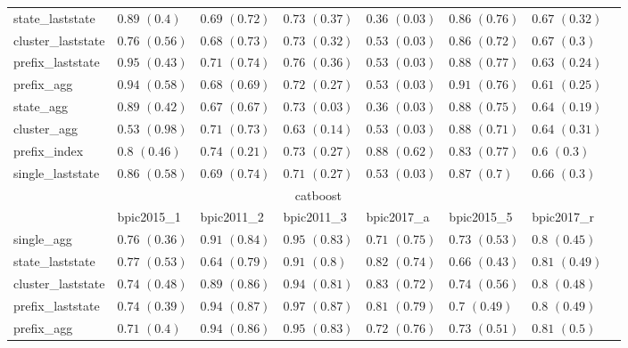 \begin{table}[!htbp]
{\begin{tabular}{llllllll}
			state\_laststate & $0.89$ ${(0.4)}$ & $0.69$ ${(0.72)}$ & $0.73$ ${(0.37)}$ & $0.36$ ${(0.03)}$ & $0.86$ ${(0.76)}$ & $\mathbf{0.67}$ $\mathbf{(0.32)}$  \\
			cluster\_laststate & $0.76$ ${(0.56)}$ & $0.68$ ${(0.73)}$ & $0.73$ ${(0.32)}$ & $0.53$ ${(0.03)}$ & $0.86$ ${(0.72)}$ & $\mathbf{0.67}$ $\mathbf{(0.3)}$  \\
			prefix\_laststate & $0.95$ ${(0.43)}$ & $0.71$ ${(0.74)}$ & $\mathbf{0.76}$ $\mathbf{(0.36)}$  & $0.53$ ${(0.03)}$ & $0.88$ ${(0.77)}$ & $0.63$ ${(0.24)}$ \\
			prefix\_agg & $0.94$ ${(0.58)}$ & $0.68$ ${(0.69)}$ & $0.72$ ${(0.27)}$ & $0.53$ ${(0.03)}$ & $0.91$ ${(0.76)}$ & $0.61$ ${(0.25)}$ \\
			state\_agg & $0.89$ ${(0.42)}$ & $0.67$ ${(0.67)}$ & $0.73$ ${(0.03)}$ & $0.36$ ${(0.03)}$ & $0.88$ ${(0.75)}$ & $0.64$ ${(0.19)}$ \\
			cluster\_agg & $0.53$ ${(0.98)}$ & $0.71$ ${(0.73)}$ & $0.63$ ${(0.14)}$ & $0.53$ ${(0.03)}$ & $0.88$ ${(0.71)}$ & $0.64$ ${(0.31)}$ \\
			prefix\_index & $0.8$ ${(0.46)}$ & $\mathbf{0.74}$ $\mathbf{(0.21)}$  & $0.73$ ${(0.27)}$ & $0.88$ ${(0.62)}$ & $0.83$ ${(0.77)}$ & $0.6$ ${(0.3)}$ \\
			single\_laststate & $0.86$ ${(0.58)}$ & $0.69$ ${(0.74)}$ & $0.71$ ${(0.27)}$ & $0.53$ ${(0.03)}$ & $0.87$ ${(0.7)}$ & $0.66$ ${(0.3)}$ \\
			\bottomrule
			\toprule
			& \multicolumn{5}{c}{catboost}
			\\
			& bpic2015\_1 & bpic2011\_2 & bpic2011\_3 & bpic2017\_a & bpic2015\_5 & bpic2017\_r
			\\ \midrule
			single\_agg & $0.76$ ${(0.36)}$ & $0.91$ ${(0.84)}$ & $0.95$ ${(0.83)}$ & $0.71$ ${(0.75)}$ & $0.73$ ${(0.53)}$ & $0.8$ ${(0.45)}$ \\
			state\_laststate & $0.77$ ${(0.53)}$ & $0.64$ ${(0.79)}$ & $0.91$ ${(0.8)}$ & $0.82$ ${(0.74)}$ & $0.66$ ${(0.43)}$ & $0.81$ ${(0.49)}$ \\
			cluster\_laststate & $0.74$ ${(0.48)}$ & $0.89$ ${(0.86)}$ & $0.94$ ${(0.81)}$ & $0.83$ ${(0.72)}$ & $\mathbf{0.74}$ $\mathbf{(0.56)}$  & $0.8$ ${(0.48)}$ \\
			prefix\_laststate & $0.74$ ${(0.39)}$ & $0.94$ ${(0.87)}$ & $\mathbf{0.97}$ $\mathbf{(0.87)}$  & $0.81$ ${(0.79)}$ & $0.7$ ${(0.49)}$ & $0.8$ ${(0.49)}$ \\
			prefix\_agg & $0.71$ ${(0.4)}$ & $0.94$ ${(0.86)}$ & $0.95$ ${(0.83)}$ & $0.72$ ${(0.76)}$ & $0.73$ ${(0.51)}$ & $0.81$ ${(0.5)}$ \\

\end{tabular}}
\end{table}
